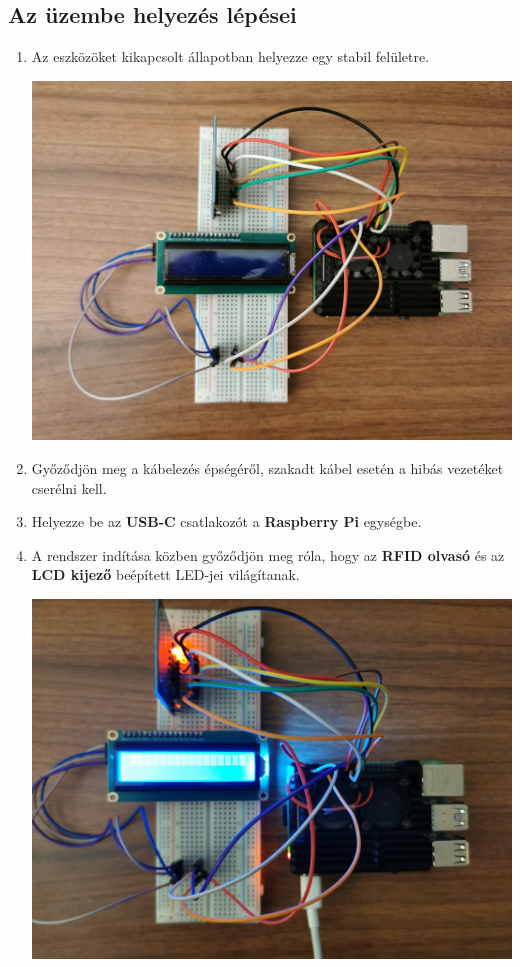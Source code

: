 \documentclass[11pt, a4paper]{article}
\begin{document}
	\subsection{Az üzembe helyezés lépései}
		\begin{enumerate}
			\justifying
			\item Az eszközöket kikapcsolt állapotban helyezze egy stabil felületre. \\
			\begin{minipage}{\linewidth}
				\centering
				\includegraphics[width=0.7\linewidth]{img/1_kikapcsolt}
				\label{fig:1kikapcsolt}
			\end{minipage}
			\item Győződjön meg a kábelezés épségéről, szakadt kábel esetén a hibás vezetéket cserélni kell.
			\item Helyezze be az \textbf{USB-C} csatlakozót a \textbf{Raspberry Pi} egységbe.
			\item A rendszer indítása közben győződjön meg róla, hogy az \textbf{RFID olvasó} és az \textbf{LCD kijező} beépített LED-jei világítanak. \\
			\begin{minipage}{\linewidth}
				\centering
				\includegraphics[width=0.7\linewidth]{img/2_indul}

\end{minipage}
\end{enumerate}
\end{document}
